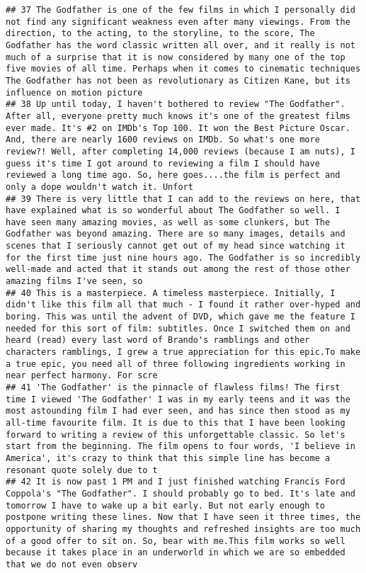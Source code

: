 \documentclass[
]{article}
\begin{document}
\begin{verbatim}
## 37 The Godfather is one of the few films in which I personally did not find any significant weakness even after many viewings. From the direction, to the acting, to the storyline, to the score, The Godfather has the word classic written all over, and it really is not much of a surprise that it is now considered by many one of the top five movies of all time. Perhaps when it comes to cinematic techniques The Godfather has not been as revolutionary as Citizen Kane, but its influence on motion picture
## 38 Up until today, I haven't bothered to review "The Godfather". After all, everyone pretty much knows it's one of the greatest films ever made. It's #2 on IMDb's Top 100. It won the Best Picture Oscar. And, there are nearly 1600 reviews on IMDb. So what's one more review?! Well, after completing 14,000 reviews (because I am nuts), I guess it's time I got around to reviewing a film I should have reviewed a long time ago. So, here goes....the film is perfect and only a dope wouldn't watch it. Unfort
## 39 There is very little that I can add to the reviews on here, that have explained what is so wonderful about The Godfather so well. I have seen many amazing movies, as well as some clunkers, but The Godfather was beyond amazing. There are so many images, details and scenes that I seriously cannot get out of my head since watching it for the first time just nine hours ago. The Godfather is so incredibly well-made and acted that it stands out among the rest of those other amazing films I've seen, so
## 40 This is a masterpiece. A timeless masterpiece. Initially, I didn't like this film all that much - I found it rather over-hyped and boring. This was until the advent of DVD, which gave me the feature I needed for this sort of film: subtitles. Once I switched them on and heard (read) every last word of Brando's ramblings and other characters ramblings, I grew a true appreciation for this epic.To make a true epic, you need all of three following ingredients working in near perfect harmony. For scre
## 41 'The Godfather' is the pinnacle of flawless films! The first time I viewed 'The Godfather' I was in my early teens and it was the most astounding film I had ever seen, and has since then stood as my all-time favourite film. It is due to this that I have been looking forward to writing a review of this unforgettable classic. So let's start from the beginning. The film opens to four words, 'I believe in America', it's crazy to think that this simple line has become a resonant quote solely due to t
## 42 It is now past 1 PM and I just finished watching Francis Ford Coppola's "The Godfather". I should probably go to bed. It's late and tomorrow I have to wake up a bit early. But not early enough to postpone writing these lines. Now that I have seen it three times, the opportunity of sharing my thoughts and refreshed insights are too much of a good offer to sit on. So, bear with me.This film works so well because it takes place in an underworld in which we are so embedded that we do not even observ

\end{verbatim}
\end{document}
